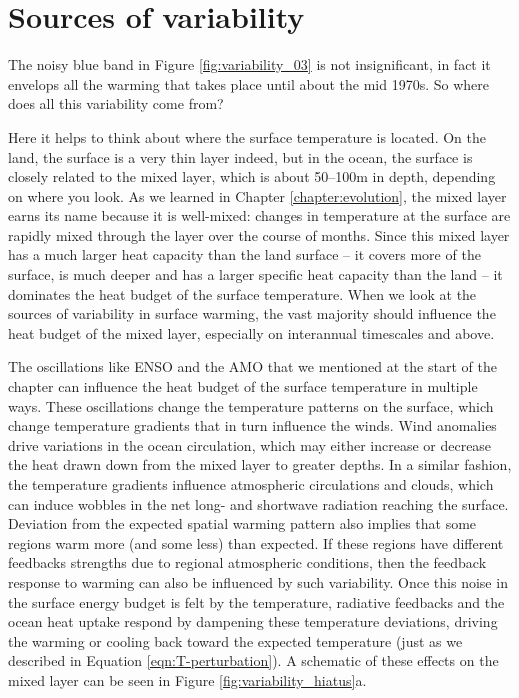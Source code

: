 \documentclass[12pt]{book}
\begin{document}
\section{Sources of variability}
The noisy blue band in Figure \ref{fig:variability_03} is not insignificant, in fact it envelops all the warming that takes place until about the mid 1970s. So where does all this variability come from? 

Here it helps to think about where the surface temperature is located. On the land, the surface is a very thin layer indeed, but in the ocean, the surface is closely related to the mixed layer, which is about 50--100m in depth, depending on where you look. As we learned in Chapter \ref{chapter:evolution}, the mixed layer earns its name because it is well-mixed: changes in temperature at the surface are rapidly mixed through the layer over the course of months. Since this mixed layer has a much larger heat capacity than the land surface -- it covers more of the surface, is much deeper and has a larger specific heat capacity than the land -- it dominates the heat budget of the surface temperature. When we look at the sources of variability in surface warming, the vast majority should influence the heat budget of the mixed layer, especially on interannual timescales and above.

The oscillations like ENSO and the AMO that we mentioned at the start of the chapter can influence the heat budget of the surface temperature in multiple ways. These oscillations change the temperature patterns on the surface, which change temperature gradients that in turn influence the winds. Wind anomalies drive variations in the ocean circulation, which may either increase or decrease the heat drawn down from the mixed layer to greater depths. In a similar fashion, the temperature gradients influence atmospheric circulations and clouds, which can induce wobbles in the net long- and shortwave radiation reaching the surface. Deviation from the expected spatial warming pattern also implies that some regions warm more (and some less) than expected. If these regions have different feedbacks strengths due to regional atmospheric conditions, then the feedback response to warming can also be influenced by such variability. Once this noise in the surface energy budget is felt by the temperature, radiative feedbacks and the ocean heat uptake respond by dampening these temperature deviations, driving the warming or cooling back toward the expected temperature (just as we described in Equation \ref{eqn:T-perturbation}). A schematic of these effects on the mixed layer can be seen in Figure \ref{fig:variability_hiatus}a.
\end{document}
